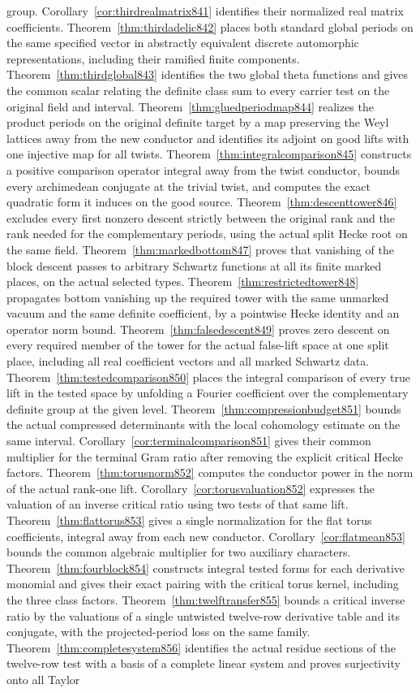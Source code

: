 \documentclass[a4paper,11pt]{article}
\theoremstyle{definition}
\theoremstyle{remark}
\numberwithin{equation}{section}
\begin{document}
group. Corollary~\ref{cor:thirdrealmatrix841} identifies their normalized real matrix coefficients. Theorem~\ref{thm:thirdadelic842} places both standard global periods on the same specified vector in abstractly equivalent discrete automorphic representations, including their ramified finite components. Theorem~\ref{thm:thirdglobal843} identifies the two global theta functions and gives the common scalar relating the definite class sum to every carrier test on the original field and interval. Theorem~\ref{thm:gluedperiodmap844} realizes the product periods on the original definite target by a map preserving the Weyl lattices away from the new conductor and identifies its adjoint on good lifts with one injective map for all twists. Theorem~\ref{thm:integralcomparison845} constructs a positive comparison operator integral away from the twist conductor, bounds every archimedean conjugate at the trivial twist, and computes the exact quadratic form it induces on the good source. Theorem~\ref{thm:descenttower846} excludes every first nonzero descent strictly between the original rank and the rank needed for the complementary periods, using the actual split Hecke root on the same field. Theorem~\ref{thm:markedbottom847} proves that vanishing of the block descent passes to arbitrary Schwartz functions at all its finite marked places, on the actual selected types. Theorem~\ref{thm:restrictedtower848} propagates bottom vanishing up the required tower with the same unmarked vacuum and the same definite coefficient, by a pointwise Hecke identity and an operator norm bound. Theorem~\ref{thm:falsedescent849} proves zero descent on every required member of the tower for the actual false-lift space at one split place, including all real coefficient vectors and all marked Schwartz data. Theorem~\ref{thm:testedcomparison850} places the integral comparison of every true lift in the tested space by unfolding a Fourier coefficient over the complementary definite group at the given level. Theorem~\ref{thm:compressionbudget851} bounds the actual compressed determinants with the local cohomology estimate on the same interval. Corollary~\ref{cor:terminalcomparison851} gives their common multiplier for the terminal Gram ratio after removing the explicit critical Hecke factors. Theorem~\ref{thm:torusnorm852} computes the conductor power in the norm of the actual rank-one lift. Corollary~\ref{cor:torusvaluation852} expresses the valuation of an inverse critical ratio using two tests of that same lift. Theorem~\ref{thm:flattorus853} gives a single normalization for the flat torus coefficients, integral away from each new conductor. Corollary~\ref{cor:flatmean853} bounds the common algebraic multiplier for two auxiliary characters. Theorem~\ref{thm:fourblock854} constructs integral tested forms for each derivative monomial and gives their exact pairing with the critical torus kernel, including the three class factors. Theorem~\ref{thm:twelftransfer855} bounds a critical inverse ratio by the valuations of a single untwisted twelve-row derivative table and its conjugate, with the projected-period loss on the same family. Theorem~\ref{thm:completesystem856} identifies the actual residue sections of the twelve-row test with a basis of a complete linear system and proves surjectivity onto all Taylor 
\end{document}
